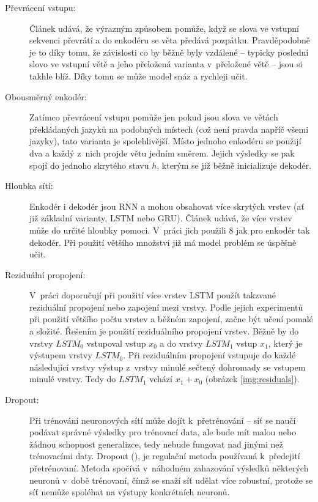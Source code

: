 \begin{description}
  \item[Převrácení vstupu:] \label{desc:revert} Článek \cite{seq2seq} udává, že výrazným způsobem pomůže, když se slova ve vstupní sekvenci převrátí a do enkodéru  se věta předává pozpátku. Pravděpodobně je to díky tomu, že závislosti co by běžně byly vzdálené -- typicky poslední slovo ve vstupní větě a jeho přeložená varianta v~přeložené větě -- jsou si takhle blíž. Díky tomu se může model snáz a rychleji učit.
  \item[Obousměrný enkodér:] \label{desc:biriectional} Zatímco převrácení vstupu pomůže jen pokud jsou slova ve větách překládaných jazyků na podobných místech (což není pravda napříč všemi jazyky), tato varianta je spolehlivější. Místo jednoho enkodéru se použijí dva a každý z~nich projde větu jedním směrem. Jejich výsledky se pak spojí do jednoho skrytého stavu $h$, kterým se již běžně inicializuje dekodér.
  \item[Hloubka sítí:] Enkodér i dekodér jsou RNN a mohou obsahovat více skrytých vrstev (ať již základní varianty, LSTM nebo GRU). Článek \cite{googleBridgingGap} udává, že více vrstev může do určité hloubky pomoci. V~práci jich použili 8 jak pro enkodér tak dekodér. Při použití většího množství již má model problém se úspěšně učit.
  \item[Reziduální propojení:] \label{residuals} V~práci \cite{googleBridgingGap} doporučují při použití více vrstev LSTM použít takzvané reziduální propojení nebo zapojení mezi vrstvy. Podle jejich experimentů při použití většího počtu vrstev a běžném zapojení, začne být učení pomalé a složité. Řešením je použití reziduálního propojení vrstev. Běžně by do vrstvy $LSTM_0$ vstupoval vstup $x_0$ a do vrstvy $LSTM_1$ vstup $x_1$, který je výstupem vrstvy $LSTM_0$. Při reziduálním propojení vstupuje do každé následující vrstvy výstup z~vrstvy minulé sečtený dohromady se vstupem minulé vrstvy. Tedy do $LSTM_1$ vchází $x_1+x_0$ (obrázek \ref{img:residuals}).
  \item[Dropout:] \label{desc:dropout} Při trénování neuronových sítí může dojít k~přetrénování -- síť se naučí podávat správné výsledky pro trénovací data, ale bude mít malou nebo žádnou schopnost generalizce, tedy nebude fungovat nad jinými než trénovacími daty. Dropout (\cite{dropout}), je regulační metoda používaná k~předejití přetrénovaní. Metoda spočívá v~náhodném zahazování výsledků některých neuronů v~době trénovaní, čímž se snaží síť udělat více robustní, protože se síť nemůže spoléhat na výstupy konkrétních neuronů.

\end{description}

